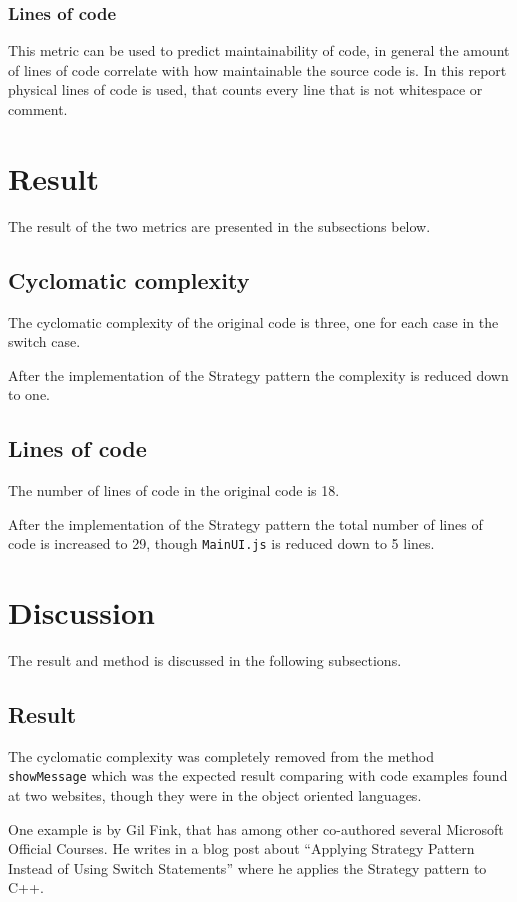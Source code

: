 \documentclass[conference, a4paper]{IEEEtran}
\begin{document}
\subsubsection{Lines of code}
This metric can be used to predict maintainability of code, in general the amount of lines of code correlate with how maintainable the source code is. In this report physical lines of code is used, that counts every line that is not whitespace or comment.

\section{Result}
The result of the two metrics are presented in the subsections below.

\subsection{Cyclomatic complexity}
The cyclomatic complexity of the original code is three, one for each case in the switch case.

After the implementation of the Strategy pattern the complexity is reduced down to one.

\subsection{Lines of code}
The number of lines of code in the original code is 18.

After the implementation of the Strategy pattern the total number of lines of code is increased to 29, though \texttt{MainUI.js} is reduced down to 5 lines.

\section{Discussion}
The result and method is discussed in the following subsections.

\subsection{Result}
The cyclomatic complexity was completely removed from the method \texttt{showMessage} which was the expected result comparing with code examples found at two websites, though they were in the object oriented languages.

One example is by Gil Fink, that has among other co-authored several Microsoft Official Courses. He writes in a blog post about ``Applying Strategy Pattern Instead of Using Switch Statements'' where he applies the Strategy pattern to C++.~\cite{bibitem:GilFink}
\end{document}
